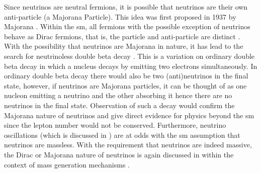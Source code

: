 Since neutrinos are neutral fermions, it is possible that neutrinos are their own anti-particle (a Majorana Particle). This idea was first proposed in 1937 by Majorana \cite{Majorana2020}. Within the \Gls{sm}, all fermions with the possible exception of neutrinos behave as Dirac fermions, that is, the particle and anti-particle are distinct \cite{dirac_majorana_neutrinos}. With the possibility that neutrinos are Majorana in nature, it has lead to the search for neutrinoless double beta decay \cite{Double_beta_decay}. This is a variation on ordinary double beta decay in which a nucleus decays by emitting two electrons simultaneously. In ordinary double beta decay there would also be two (anti)neutrinos in the final state, however, if neutrinos are Majorana particles, it can be thought of as one nucleon emitting a neutrino and the other absorbing it hence there are no neutrinos in the final state. Observation of such a decay would confirm the Majorana nature of neutrinos and give direct evidence for physics beyond the \Gls{sm} since the lepton number would not be conserved. Furthermore, neutrino oscillations (which is discussed in ) are at odds with the \gls{sm} assumption that neutrinos are massless. With the requirement that neutrinos are indeed massive, the Dirac or Majorana nature of neutrinos is again discussed in  within the context of mass generation mechanisms \cite{The_physics_of_neutrinos_book}.

